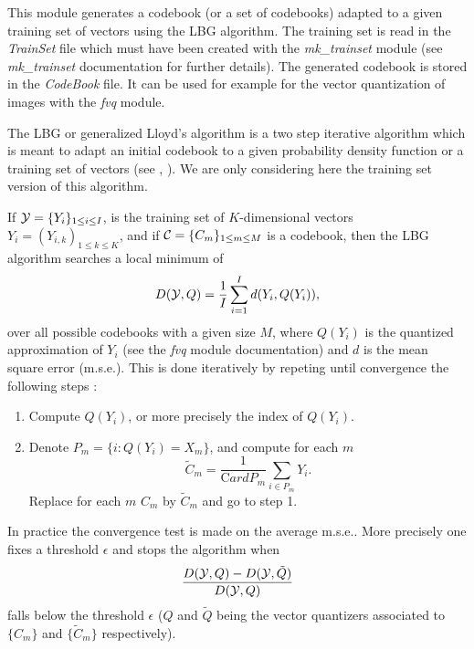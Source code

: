 This module generates a codebook (or a set of codebooks) adapted to a given 
training set of vectors using the LBG algorithm. The training set is read 
in the {\em TrainSet} file which must have been created with 
the {\em mk\_trainset} module (see {\em mk\_trainset} documentation for 
further details). The generated codebook is stored in the {\em CodeBook} 
file. It can be used for example for the vector quantization of images 
with the {\em fvq} module. 

The LBG or generalized Lloyd's algorithm is a two step iterative algorithm 
which is meant to adapt an initial codebook to a given probability 
density function or a training set of vectors (see \cite{kn:lbg}, 
\cite{kn:gg}). We are only considering here the training set version 
of this algorithm.

If ${\cal Y} = \{Y_i\}_{1\leq i\leq I}$, is the training set of 
$K$-dimensional vectors $Y_i=(Y_{i,k})_{1\leq k\leq K}$, and if 
${\cal C} = \{C_m\}_{1\leq m\leq M}$ is a codebook, then the LBG algorithm 
searches a local minimum of 
\[
D({\cal Y}, Q) = \frac{1}{I} \sum_{i=1}^I d(Y_i, Q(Y_i)),
\]
over all possible codebooks with a given size $M$, 
where $Q(Y_i)$ is the quantized approximation of $Y_i$ (see the {\em fvq} 
module documentation) and $d$ is the mean square error (m.s.e.). 
This is done iteratively by repeting until convergence the following steps : 
\begin{enumerate}
\item
Compute $Q(Y_i)$, or more precisely the index of $Q(Y_i)$. 
\item
Denote $P_m=\{i : Q(Y_i) = X_m\}$, and compute for each $m$ 
\[
\tilde{C}_m = \frac{1}{{\mathrm Card} P_m} \sum_{i\in P_m} Y_i.
\]
Replace for each $m$ $C_m$ by $\tilde{C}_m$ and go to step 1.
\end{enumerate}
In practice the convergence test is made on the average m.s.e.. 
More precisely one fixes a threshold $\epsilon$ and stops the algorithm 
when 
\[
\frac{D({\cal Y}, Q) - D({\cal Y}, \tilde{Q})}{D({\cal Y}, Q)}
\]
falls below the threshold $\epsilon$ ($Q$ and $\tilde{Q}$ being the vector 
quantizers associated to $\{C_m\}$ and $\{\tilde{C}_m\}$ respectively). 

